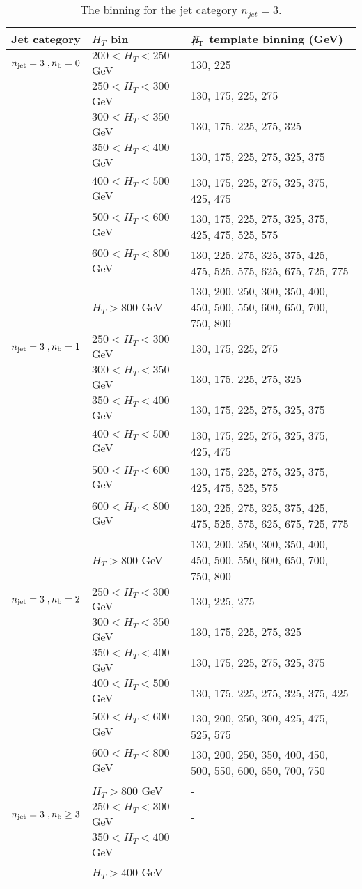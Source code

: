 \begin{table}[h!]
  \scriptsize
  \centering
  \caption{The \MHT binning for the jet category $n_{jet} = 3$. 
  \label{tab:mhtBins_eq3j}}
  \begin{tabular}{ lll }
    Jet category & $H_{T}$ bin & $\MHT$ template binning (GeV) \\ \hline

    \hline
    $n_{\text{jet}} = 3 \;, n_{\text{b}} = 0 $ & $200 < H_{T} < 250$ GeV & 130, 225 \\ 
     & $250 < H_{T} < 300$ GeV & 130, 175, 225, 275 \\ 
     & $300 < H_{T} < 350$ GeV & 130, 175, 225, 275, 325 \\ 
     & $350 < H_{T} < 400$ GeV & 130, 175, 225, 275, 325, 375 \\ 
     & $400 < H_{T} < 500$ GeV & 130, 175, 225, 275, 325, 375, 425, 475 \\ 
     & $500 < H_{T} < 600$ GeV & 130, 175, 225, 275, 325, 375, 425, 475, 525, 575 \\ 
     & $600 < H_{T} < 800$ GeV & 130, 225, 275, 325, 375, 425, 475, 525, 575, 625, 675, 725, 775 \\ 
     & $H_{T} > 800$ GeV & 130, 200, 250, 300, 350, 400, 450, 500, 550, 600, 650, 700, 750, 800 \\ 
    \hline
    $n_{\text{jet}} = 3 \;, n_{\text{b}} = 1$ & $250 < H_{T} < 300$ GeV & 130, 175, 225, 275 \\ 
     & $300 < H_{T} < 350$ GeV & 130, 175, 225, 275, 325 \\ 
     & $350 < H_{T} < 400$ GeV & 130, 175, 225, 275, 325, 375 \\ 
     & $400 < H_{T} < 500$ GeV & 130, 175, 225, 275, 325, 375, 425, 475 \\ 
     & $500 < H_{T} < 600$ GeV & 130, 175, 225, 275, 325, 375, 425, 475, 525, 575 \\ 
     & $600 < H_{T} < 800$ GeV & 130, 225, 275, 325, 375, 425, 475, 525, 575, 625, 675, 725, 775 \\ 
     & $H_{T} > 800$ GeV & 130, 200, 250, 300, 350, 400, 450, 500, 550, 600, 650, 700, 750, 800 \\ 
    \hline
    $n_{\text{jet}} = 3 \;, n_{\text{b}} = 2 $ & $250 < H_{T} < 300$ GeV & 130, 225, 275 \\ 
     & $300 < H_{T} < 350$ GeV & 130, 175, 225, 275, 325 \\ 
     & $350 < H_{T} < 400$ GeV & 130, 175, 225, 275, 325, 375 \\ 
     & $400 < H_{T} < 500$ GeV & 130, 175, 225, 275, 325, 375, 425 \\ 
     & $500 < H_{T} < 600$ GeV & 130, 200, 250, 300, 425, 475, 525, 575 \\ 
     & $600 < H_{T} < 800$ GeV & 130, 200, 250, 350, 400, 450, 500, 550, 600, 650, 700, 750 \\ 
     & $H_{T} > 800$ GeV & - \\ 
    \hline
    $n_{\text{jet}} = 3 \;, n_{\text{b}} \geq 3$ & $250 < H_{T} < 300$ GeV & - \\ 
     & $350 < H_{T} < 400$ GeV & - \\ 
     & $H_{T} > 400$ GeV & - \\ 


\end{tabular}
\end{table}
